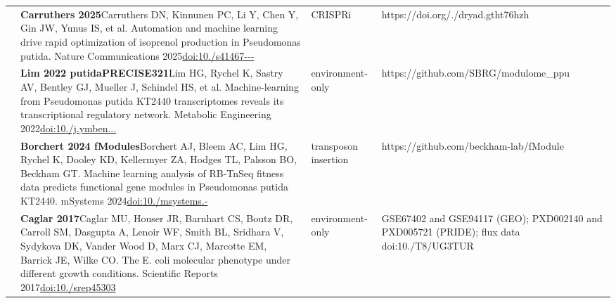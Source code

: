 \begin{landscape}
\begin{longtable}{@{}r@{\hspace{4pt}} L{86mm} L{74mm} L{78mm}@{}}
 & \textbf{Carruthers 2025}\newline Carruthers DN, Kinnunen PC, Li Y, Chen Y, Gin JW, Yunus IS, et al. Automation and machine learning drive rapid optimization of isoprenol production in Pseudomonas putida. Nature Communications 2025\newline \href{https://doi.org/10.1038/s41467-025-66304-8}{doi:10./\allowbreak s41467---} & CRISPRi & https:/\allowbreak /\allowbreak doi.\allowbreak org/./\allowbreak dryad.\allowbreak gtht76hzh \\
 & \textbf{Lim 2022 putidaPRECISE321}\newline Lim HG, Rychel K, Sastry AV, Bentley GJ, Mueller J, Schindel HS, et al. Machine-learning from Pseudomonas putida KT2440 transcriptomes reveals its transcriptional regulatory network. Metabolic Engineering 2022\newline \href{https://doi.org/10.1016/j.ymben.2022.04.004}{doi:10./\allowbreak j.\allowbreak ymben...} & environment-only & https:/\allowbreak /\allowbreak github.\allowbreak com/\allowbreak SBRG/\allowbreak modulome\_\allowbreak ppu \\
 & \textbf{Borchert 2024 fModules}\newline Borchert AJ, Bleem AC, Lim HG, Rychel K, Dooley KD, Kellermyer ZA, Hodges TL, Palsson BO, Beckham GT. Machine learning analysis of RB-TnSeq fitness data predicts functional gene modules in Pseudomonas putida KT2440. mSystems 2024\newline \href{https://doi.org/10.1128/msystems.00942-23}{doi:10./\allowbreak msystems.-} & transposon insertion & https:/\allowbreak /\allowbreak github.\allowbreak com/\allowbreak beckham-\allowbreak lab/\allowbreak fModule \\
 & \textbf{Caglar 2017}\newline Caglar MU, Houser JR, Barnhart CS, Boutz DR, Carroll SM, Dasgupta A, Lenoir WF, Smith BL, Sridhara V, Sydykova DK, Vander Wood D, Marx CJ, Marcotte EM, Barrick JE, Wilke CO. The E. coli molecular phenotype under different growth conditions. Scientific Reports 2017\newline \href{https://doi.org/10.1038/srep45303}{doi:10./\allowbreak srep45303} & environment-only & GSE67402 and GSE94117 (GEO); PXD002140 and PXD005721 (PRIDE); flux data doi:10./\allowbreak T8/\allowbreak UG3TUR \\

\end{longtable}
\end{landscape}
